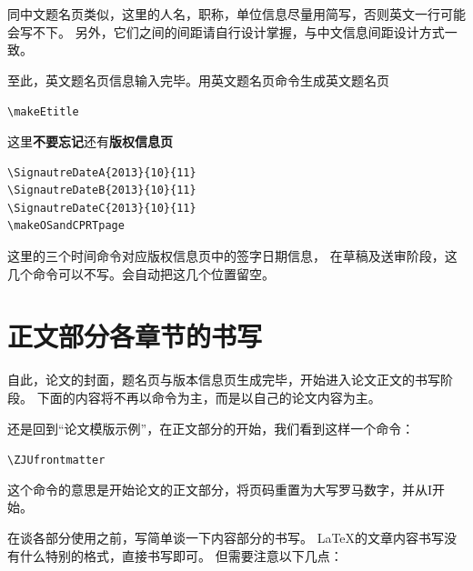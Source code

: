 同中文题名页类似，这里的人名，职称，单位信息尽量用简写，否则英文一行可能会写不下。
另外，它们之间的间距请自行设计掌握，与中文信息间距设计方式一致。

至此，英文题名页信息输入完毕。用英文题名页命令生成英文题名页

\vspace{8pt}
\verb+\makeEtitle+
\vspace{8pt}

这里{\bfseries 不要忘记}还有{\bfseries 版权信息页}

{
\begin{verbatim}
\SignautreDateA{2013}{10}{11}
\SignautreDateB{2013}{10}{11}
\SignautreDateC{2013}{10}{11}
\makeOSandCPRTpage
\end{verbatim}
}

这里的三个时间命令对应版权信息页中的签字日期信息，
在草稿及送审阶段，这几个命令可以不写。会自动把这几个位置留空。

\section{正文部分各章节的书写}

自此，论文的封面，题名页与版本信息页生成完毕，开始进入论文正文的书写阶段。
下面的内容将不再以命令为主，而是以自己的论文内容为主。

还是回到“论文模版示例”，在正文部分的开始，我们看到这样一个命令：

\verb+\ZJUfrontmatter+

这个命令的意思是开始论文的正文部分，将页码重置为大写罗马数字，并从I开始。


在谈各部分使用之前，写简单谈一下内容部分的书写。
\LaTeX 的文章内容书写没有什么特别的格式，直接书写即可。
但需要注意以下几点：

